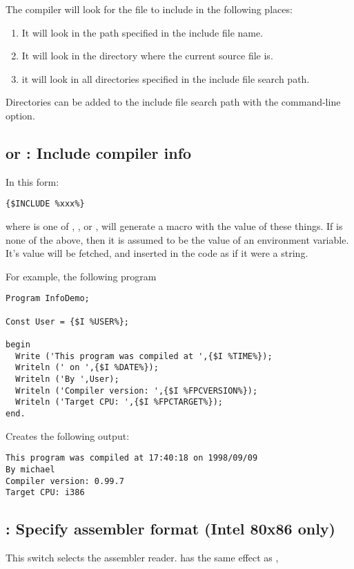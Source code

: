 The compiler will look for the file to include in the following places:

\begin{enumerate}
\item It will look in the path specified in the include file name.
\item It will look in the directory where the current source file is.
\item it will look in all directories specified in the include file search
path.
\end{enumerate}
Directories can be added to the include file search path with the 
command-line option.

\subsection{ or  : Include compiler info}

In this form:
\begin{verbatim}
{$INCLUDE %xxx%}
\end{verbatim}
where  is one of , ,  or
, will generate a macro with the value of these things.
If  is none of the above, then it is assumed to be the value of
an environment variable. It's value will be fetched, and inserted in the code
as if it were a string.

For example, the following program
\begin{verbatim}
Program InfoDemo;

Const User = {$I %USER%};

begin
  Write ('This program was compiled at ',{$I %TIME%});
  Writeln (' on ',{$I %DATE%});
  Writeln ('By ',User);
  Writeln ('Compiler version: ',{$I %FPCVERSION%});
  Writeln ('Target CPU: ',{$I %FPCTARGET%});
end.
\end{verbatim}
Creates the following output:
\begin{verbatim}
This program was compiled at 17:40:18 on 1998/09/09
By michael
Compiler version: 0.99.7
Target CPU: i386
\end{verbatim}

\subsection{ : Specify assembler format (Intel 80x86 only)}

This switch selects the assembler reader. 
has the same effect as , 

